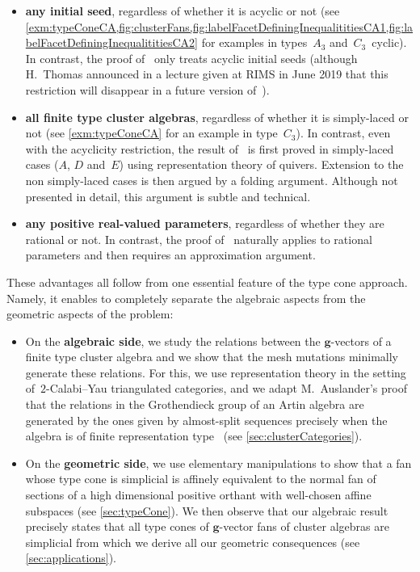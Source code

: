 \documentclass{amsart}
\theoremstyle{definition}
\renewcommand{\b}[1]{{\boldsymbol{#1}}} %
\begin{document}
\smallskip
\begin{itemize}
\item \textbf{any initial seed}, regardless of whether it is acyclic or not (see \cref{exm:typeConeCA,fig:clusterFans,fig:labelFacetDefiningInequalititiesCA1,fig:labelFacetDefiningInequalititiesCA2} for examples in types~$A_3$ and~$C_3$~cyclic). In contrast, the proof of~\cite{BazierMatteDouvilleMousavandThomasYildirim} only treats acyclic initial seeds (although H.~Thomas announced in a lecture given at RIMS in June 2019 that this restriction will disappear in a future version of~\cite{BazierMatteDouvilleMousavandThomasYildirim}).

\smallskip
\item \textbf{all finite type cluster algebras}, regardless of whether it is simply-laced or not (see \cref{exm:typeConeCA} for an example in type~$C_3$). In contrast, even with the acyclicity restriction, the result of~\cite{BazierMatteDouvilleMousavandThomasYildirim} is first proved in simply-laced cases ($A$, $D$ and~$E$) using representation theory of quivers. Extension to the non simply-laced cases is then argued by a folding argument. Although not presented in detail, this argument is subtle and technical.

\smallskip
\item \textbf{any positive real-valued parameters}, regardless of whether they are rational or not. In contrast, the proof of~\cite{BazierMatteDouvilleMousavandThomasYildirim} naturally applies to rational parameters and then requires an approximation argument.
\end{itemize}

\smallskip
\noindent
These advantages all follow from one essential feature of the type cone approach.
Namely, it enables to completely separate the algebraic aspects from the geometric aspects of the problem:
\begin{itemize}
\item On the \textbf{algebraic side}, we study the relations between the $\b{g}$-vectors of a finite type cluster algebra and we show that the mesh mutations minimally generate these relations.
For this, we use representation theory in the setting of~$2$-Calabi--Yau triangulated categories, and we adapt M.~Auslander's proof that the relations in the Grothendieck group of an Artin algebra are generated by the ones given by almost-split sequences precisely when the algebra is of finite representation type~\cite{Auslander1984} (see \cref{sec:clusterCategories}).

\smallskip
\item On the \textbf{geometric side}, we use elementary manipulations to show that a fan whose type cone is simplicial is affinely equivalent to the normal fan of sections of a high dimensional positive orthant with well-chosen affine subspaces (see \cref{sec:typeCone}). We then observe that our algebraic result precisely states that all type cones of $\b{g}$-vector fans of cluster algebras are simplicial from which we derive all our geometric consequences (see \cref{sec:applications}).
\end{itemize}
\end{document}
